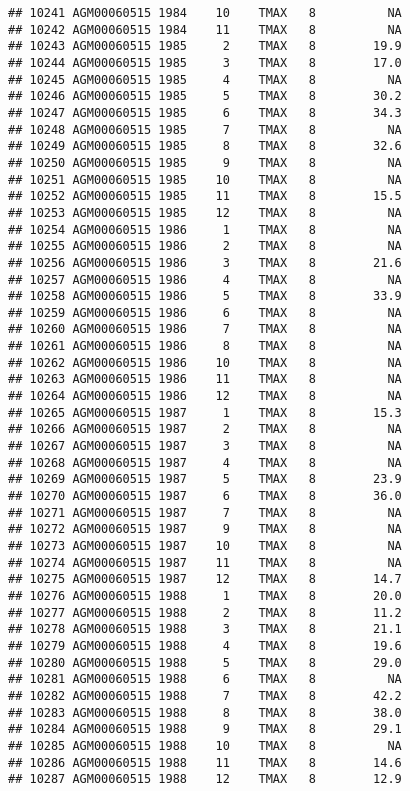 \documentclass{article}\usepackage[]{graphicx}\usepackage[]{color}
\makeatletter
\newenvironment{kframe}{%
 \def\at@end@of@kframe{}%
 \ifinner\ifhmode%
  \def\at@end@of@kframe{\end{minipage}}%
  \begin{minipage}{\columnwidth}%
 \fi\fi%
 \def\FrameCommand##1{\hskip\@totalleftmargin \hskip-\fboxsep
 \colorbox{shadecolor}{##1}\hskip-\fboxsep
     \hskip-\linewidth \hskip-\@totalleftmargin \hskip\columnwidth}%
 \MakeFramed {\advance\hsize-\width
   \@totalleftmargin\z@ \linewidth\hsize
   \@setminipage}}%
 {\par\unskip\endMakeFramed%
 \at@end@of@kframe}
\newenvironment{knitrout}{}{} %
\makeatother
\begin{document}
\begin{knitrout}
\begin{kframe}
\begin{verbatim}
## 10241 AGM00060515 1984    10    TMAX   8          NA
## 10242 AGM00060515 1984    11    TMAX   8          NA
## 10243 AGM00060515 1985     2    TMAX   8        19.9
## 10244 AGM00060515 1985     3    TMAX   8        17.0
## 10245 AGM00060515 1985     4    TMAX   8          NA
## 10246 AGM00060515 1985     5    TMAX   8        30.2
## 10247 AGM00060515 1985     6    TMAX   8        34.3
## 10248 AGM00060515 1985     7    TMAX   8          NA
## 10249 AGM00060515 1985     8    TMAX   8        32.6
## 10250 AGM00060515 1985     9    TMAX   8          NA
## 10251 AGM00060515 1985    10    TMAX   8          NA
## 10252 AGM00060515 1985    11    TMAX   8        15.5
## 10253 AGM00060515 1985    12    TMAX   8          NA
## 10254 AGM00060515 1986     1    TMAX   8          NA
## 10255 AGM00060515 1986     2    TMAX   8          NA
## 10256 AGM00060515 1986     3    TMAX   8        21.6
## 10257 AGM00060515 1986     4    TMAX   8          NA
## 10258 AGM00060515 1986     5    TMAX   8        33.9
## 10259 AGM00060515 1986     6    TMAX   8          NA
## 10260 AGM00060515 1986     7    TMAX   8          NA
## 10261 AGM00060515 1986     8    TMAX   8          NA
## 10262 AGM00060515 1986    10    TMAX   8          NA
## 10263 AGM00060515 1986    11    TMAX   8          NA
## 10264 AGM00060515 1986    12    TMAX   8          NA
## 10265 AGM00060515 1987     1    TMAX   8        15.3
## 10266 AGM00060515 1987     2    TMAX   8          NA
## 10267 AGM00060515 1987     3    TMAX   8          NA
## 10268 AGM00060515 1987     4    TMAX   8          NA
## 10269 AGM00060515 1987     5    TMAX   8        23.9
## 10270 AGM00060515 1987     6    TMAX   8        36.0
## 10271 AGM00060515 1987     7    TMAX   8          NA
## 10272 AGM00060515 1987     9    TMAX   8          NA
## 10273 AGM00060515 1987    10    TMAX   8          NA
## 10274 AGM00060515 1987    11    TMAX   8          NA
## 10275 AGM00060515 1987    12    TMAX   8        14.7
## 10276 AGM00060515 1988     1    TMAX   8        20.0
## 10277 AGM00060515 1988     2    TMAX   8        11.2
## 10278 AGM00060515 1988     3    TMAX   8        21.1
## 10279 AGM00060515 1988     4    TMAX   8        19.6
## 10280 AGM00060515 1988     5    TMAX   8        29.0
## 10281 AGM00060515 1988     6    TMAX   8          NA
## 10282 AGM00060515 1988     7    TMAX   8        42.2
## 10283 AGM00060515 1988     8    TMAX   8        38.0
## 10284 AGM00060515 1988     9    TMAX   8        29.1
## 10285 AGM00060515 1988    10    TMAX   8          NA
## 10286 AGM00060515 1988    11    TMAX   8        14.6
## 10287 AGM00060515 1988    12    TMAX   8        12.9

\end{verbatim}
\end{kframe}
\end{knitrout}
\end{document}

